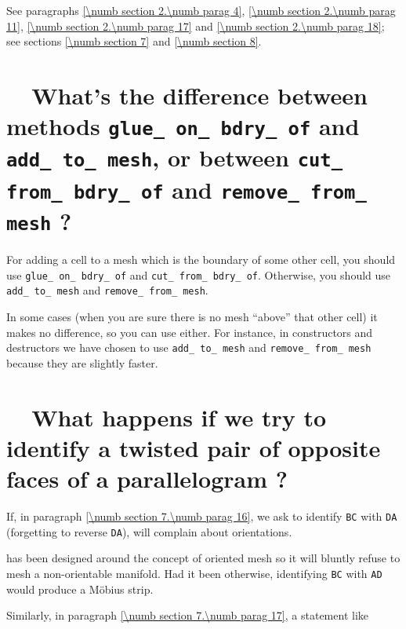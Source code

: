 See paragraphs \ref{\numb section 2.\numb parag 4}, \ref{\numb section 2.\numb parag 11},
\ref{\numb section 2.\numb parag 17} and \ref{\numb section 2.\numb parag 18};
see sections \ref{\numb section 7} and \ref{\numb section 8}.


\section{~~What's the difference between methods {\tt glue\_\,on\_\,bdry\_\,of} and
  {\tt add\_\,to\_\,mesh}, or between {\tt cut\_\,from\_\,bdry\_\,of} and
  {\tt remove\_\,from\_\,mesh} ?}
\label{\numb section 13.\numb parag 4}

For adding a cell to a mesh which is the boundary of some other cell,
you should use {\small\tt glue\_\,on\_\,bdry\_\,of} and {\small\tt cut\_\,from\_\,bdry\_\,of}.
Otherwise, you should use {\small\tt add\_\,to\_\,mesh} and {\small\tt remove\_\,from\_\,mesh}.

In some cases (when you are sure there is no mesh ``above'' that other cell)
it makes no difference, so you can use either.
For instance, in {\small\tt{}} constructors and destructors
we have chosen to use {\small\tt add\_\,to\_\,mesh} and {\small\tt remove\_\,from\_\,mesh}
because they are slightly faster.


\section{~~What happens if we try to identify a twisted pair of
           opposite faces of a parallelogram ?}
\label{\numb section 13.\numb parag 5}

If, in paragraph \ref{\numb section 7.\numb parag 16}, we ask {\maniFEM} to identify
{\small\tt BC} with {\small\tt DA} (forgetting to reverse {\small\tt DA}),
{\maniFEM} will complain about orientations.

\ManiFEM{} has been designed around the concept of oriented mesh so it will
bluntly refuse to mesh a non-orientable manifold.
Had it been otherwise, identifying {\small\tt BC} with {\small\tt AD}
would produce a M\"obius strip.

Similarly, in paragraph \ref{\numb section 7.\numb parag 17}, a statement like

